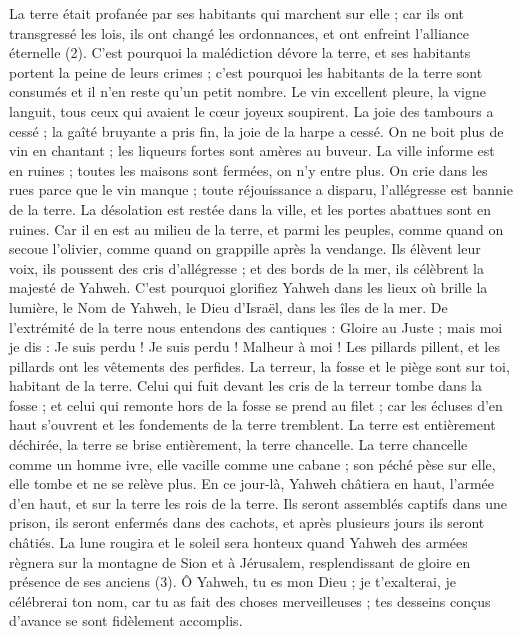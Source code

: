 \begin{multicols}{2}
La terre était profanée par ses habitants qui marchent sur elle ; car ils ont transgressé les lois, ils ont changé les ordonnances, et ont enfreint l'alliance éternelle (2).
C'est pourquoi la malédiction dévore la terre, et ses habitants portent la peine de leurs crimes ; c’est pourquoi les habitants de la terre sont consumés et il n’en reste qu’un petit nombre.
Le vin excellent pleure, la vigne languit, tous ceux qui avaient le cœur joyeux soupirent.
La joie des tambours a cessé ; la gaîté bruyante a pris fin, la joie de la harpe a cessé.
On ne boit plus de vin en chantant ; les liqueurs fortes sont amères au buveur.
La ville informe est en ruines ; toutes les maisons sont fermées, on n’y entre plus.
On crie dans les rues parce que le vin manque ; toute réjouissance a disparu, l'allégresse est bannie de la terre.
La désolation est restée dans la ville, et les portes abattues sont en ruines.
Car il en est au milieu de la terre, et parmi les peuples, comme quand on secoue l'olivier, comme quand on grappille après la vendange.
Ils élèvent leur voix, ils poussent des cris d’allégresse ; et des bords de la mer, ils célèbrent la majesté de Yahweh.
C'est pourquoi glorifiez Yahweh dans les lieux où brille la lumière, le Nom de Yahweh, le Dieu d'Israël, dans les îles de la mer.
De l’extrémité de la terre nous entendons des cantiques : Gloire au Juste ; mais moi je dis : Je suis perdu ! Je suis perdu ! Malheur à moi ! Les pillards pillent, et les pillards ont les vêtements des perfides.
La terreur, la fosse et le piège sont sur toi, habitant de la terre.
Celui qui fuit devant les cris de la terreur tombe dans la fosse ; et celui qui remonte hors de la fosse se prend au filet ; car les écluses d'en haut s’ouvrent et les fondements de la terre tremblent.
La terre est entièrement déchirée, la terre se brise entièrement, la terre chancelle.
La terre chancelle comme un homme ivre, elle vacille comme une cabane ; son péché pèse sur elle, elle tombe et ne se relève plus.
En ce jour-là, Yahweh châtiera en haut, l'armée d’en haut, et sur la terre les rois de la terre.
Ils seront assemblés captifs dans une prison, ils seront enfermés dans des cachots, et après plusieurs jours ils seront châtiés.
La lune rougira et le soleil sera honteux quand Yahweh des armées règnera sur la montagne de Sion et à Jérusalem, resplendissant de gloire en présence de ses anciens (3).
\VerseOne{}Ô Yahweh, tu es mon Dieu ; je t'exalterai, je célébrerai ton nom, car tu as fait des choses merveilleuses ; tes desseins conçus d’avance se sont fidèlement accomplis.

\end{multicols}
